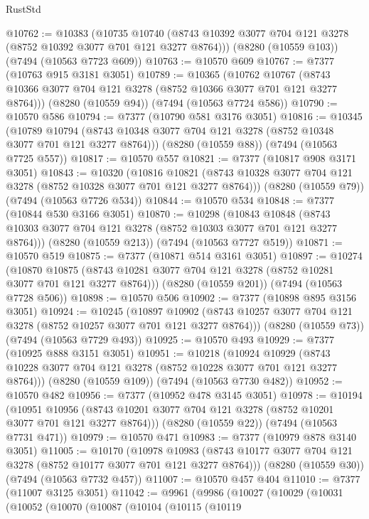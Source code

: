 \begin{lexlean}{RustStd}
\begin{coremodule}
{\begin{coremodule}
{{{{{{{{{{{{{{{{{{{{{{{{{{{{{{{{@10762 := @10383
    (@10735 @10740 (@8743 @10392 @3077 @704 @121 @3278 (@8752 @10392 @3077 @701 @121 @3277 @8764)))
    (@8280 (@10559 @103))
    (@7494 (@10563 @7723 @609))
@10763 := @10570 @609
@10767 := @7377 (@10763 @915 @3181 @3051)
@10789 := @10365
    (@10762 @10767 (@8743 @10366 @3077 @704 @121 @3278 (@8752 @10366 @3077 @701 @121 @3277 @8764)))
    (@8280 (@10559 @94))
    (@7494 (@10563 @7724 @586))
@10790 := @10570 @586
@10794 := @7377 (@10790 @581 @3176 @3051)
@10816 := @10345
    (@10789 @10794 (@8743 @10348 @3077 @704 @121 @3278 (@8752 @10348 @3077 @701 @121 @3277 @8764)))
    (@8280 (@10559 @88))
    (@7494 (@10563 @7725 @557))
@10817 := @10570 @557
@10821 := @7377 (@10817 @908 @3171 @3051)
@10843 := @10320
    (@10816 @10821 (@8743 @10328 @3077 @704 @121 @3278 (@8752 @10328 @3077 @701 @121 @3277 @8764)))
    (@8280 (@10559 @79))
    (@7494 (@10563 @7726 @534))
@10844 := @10570 @534
@10848 := @7377 (@10844 @530 @3166 @3051)
@10870 := @10298
    (@10843 @10848 (@8743 @10303 @3077 @704 @121 @3278 (@8752 @10303 @3077 @701 @121 @3277 @8764)))
    (@8280 (@10559 @213))
    (@7494 (@10563 @7727 @519))
@10871 := @10570 @519
@10875 := @7377 (@10871 @514 @3161 @3051)
@10897 := @10274
    (@10870 @10875 (@8743 @10281 @3077 @704 @121 @3278 (@8752 @10281 @3077 @701 @121 @3277 @8764)))
    (@8280 (@10559 @201))
    (@7494 (@10563 @7728 @506))
@10898 := @10570 @506
@10902 := @7377 (@10898 @895 @3156 @3051)
@10924 := @10245
    (@10897 @10902 (@8743 @10257 @3077 @704 @121 @3278 (@8752 @10257 @3077 @701 @121 @3277 @8764)))
    (@8280 (@10559 @73))
    (@7494 (@10563 @7729 @493))
@10925 := @10570 @493
@10929 := @7377 (@10925 @888 @3151 @3051)
@10951 := @10218
    (@10924 @10929 (@8743 @10228 @3077 @704 @121 @3278 (@8752 @10228 @3077 @701 @121 @3277 @8764)))
    (@8280 (@10559 @109))
    (@7494 (@10563 @7730 @482))
@10952 := @10570 @482
@10956 := @7377 (@10952 @478 @3145 @3051)
@10978 := @10194
    (@10951 @10956 (@8743 @10201 @3077 @704 @121 @3278 (@8752 @10201 @3077 @701 @121 @3277 @8764)))
    (@8280 (@10559 @22))
    (@7494 (@10563 @7731 @471))
@10979 := @10570 @471
@10983 := @7377 (@10979 @878 @3140 @3051)
@11005 := @10170
    (@10978 @10983 (@8743 @10177 @3077 @704 @121 @3278 (@8752 @10177 @3077 @701 @121 @3277 @8764)))
    (@8280 (@10559 @30))
    (@7494 (@10563 @7732 @457))
@11007 := @10570 @457 @404
@11010 := @7377 (@11007 @3125 @3051)
@11042 := @9961
    (@9986
      (@10027
        (@10029
          (@10031
            (@10052
              (@10070
                (@10087
                  (@10104
                    (@10115
                      (@10119
}}}}}}}}}}}}}}}}}}}}}}}}}}}}}}}}
\end{coremodule}}
\end{coremodule}
\end{lexlean}
